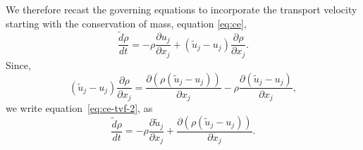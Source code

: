 We therefore recast the governing equations to incorporate the transport
velocity starting with the conservation of mass, equation \eqref{eq:ce},
\begin{equation}
  \label{eq:ce-tvf-2}
  \frac{\tilde{d} \rho}{d t} = - \rho \frac{\partial u_j}{\partial x_j}+
  (\tilde{u}_j - u_j) \frac{\partial \rho} {\partial x_j}.
\end{equation}
Since,
\begin{equation}
  \label{eq:tmp:div-vv}
  (\tilde{u}_j - u_j)  \frac{\partial \rho}{\partial x_j} =
  \frac{\partial (\rho (\tilde{u}_j - u_j))}{\partial x_j} -
  \rho \frac{\partial (\tilde{u}_j - u_j)}{\partial x_j},
\end{equation}
we write equation~\eqref{eq:ce-tvf-2}, as
\begin{equation}
  \label{eq:ce-tvf}
  \frac{\tilde{d} \rho}{d t} =
  - \rho \frac{\partial \tilde{u}_j}{\partial x_j} +
  \frac{\partial (\rho (\tilde{u}_j - u_j))}{\partial x_j}.
\end{equation}

